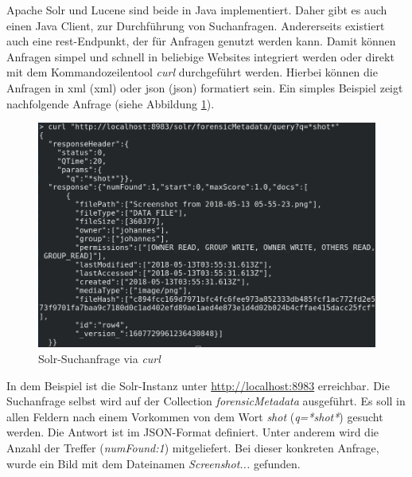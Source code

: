 \noindent
Apache Solr und Lucene sind beide in Java implementiert. Daher gibt es auch einen Java Client, zur Durchführung von Suchanfragen. Andererseits existiert auch eine \gls{rest}-Endpunkt, der für Anfragen genutzt werden kann. Damit können Anfragen simpel und schnell in beliebige Websites integriert werden oder direkt mit dem Kommandozeilentool \textit{curl} durchgeführt werden. Hierbei können die Anfragen in \acrshort{xml} (\acrlong{xml}) oder \acrshort{json} (\acrlong{json}) formatiert sein. Ein simples Beispiel zeigt nachfolgende Anfrage (siehe Abbildung \ref{fig:solr_request}).\\

\begin{figure}[ht]
  \centering
  \includegraphics[width=\textwidth]{./resource/solr_request.png}
  \caption{Solr-Suchanfrage via \textit{curl}}
  \label{fig:solr_request}
\end{figure}

\noindent
In dem Beispiel ist die Solr-Instanz unter \url{http://localhost:8983} erreichbar. Die Suchanfrage selbst wird auf der Collection \textit{forensicMetadata} ausgeführt. Es soll in allen Feldern nach einem Vorkommen von dem Wort \textit{shot} (\textit{q=*shot*}) gesucht werden. Die Antwort ist im JSON-Format definiert. Unter anderem wird die Anzahl der Treffer (\textit{numFound:1}) mitgeliefert. Bei dieser konkreten Anfrage, wurde ein Bild mit dem Dateinamen \textit{Screenshot...} gefunden. 